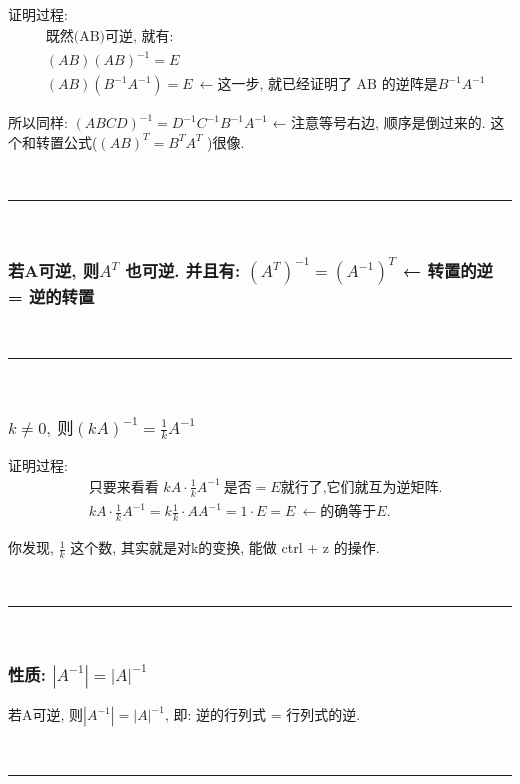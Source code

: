 \documentclass[UTF8]{ctexart}
\begin{document}
\begin{myEnvSample}
证明过程: 
\begin{align*}
	& \text{既然(AB)可逆, 就有:} \\
	& (AB)(AB)^{-1} = E \\
	& (AB)(B^{-1} A^{-1}) = E \ ← \text{这一步, 就已经证明了 AB 的逆阵是}  B^{-1} A^{-1}
\end{align*}
\end{myEnvSample}



所以同样: $
\left( ABCD \right) ^{-1}=D^{-1}C^{-1}B^{-1}A^{-1}  
$  ← 注意等号右边, 顺序是倒过来的. 这个和转置公式($\left( AB \right) ^T=B^TA^T$ )很像. 

~\\
\hrule
~\\

\subsubsection{若A可逆, 则$A^T$ 也可逆. 并且有: $\left( A^T \right) ^{-1}=\left( A^{-1} \right) ^T$ ← 转置的逆 = 逆的转置}

~\\
\hrule
~\\

\subsubsection{$k\ne 0,\ \text{则}\left( kA \right) ^{-1}=\frac{1}{k}A^{-1}$}

证明过程:
\begin{align*}
		& \text{只要来看看\ }kA\cdot \frac{1}{k}A^{-1}\ \text{是否}=E\text{就行了,它们就互为逆矩阵}.\\
	& kA\cdot \frac{1}{k}A^{-1}=k\frac{1}{k}\cdot AA^{-1}=1\cdot E=E\ ←\text{的确等于}E.
\end{align*}

你发现, $\frac{1}{k} $ 这个数, 其实就是对k的变换, 能做 ctrl + z 的操作.

~\\
\hrule
~\\

\subsubsection{性质: $|A^{-1}|=|A|^{-1}$}

若A可逆, 则$ |A^{-1}| = |A|^{-1}$, 即: 逆的行列式 = 行列式的逆.

~\\
\hrule
~\\
\end{document}
